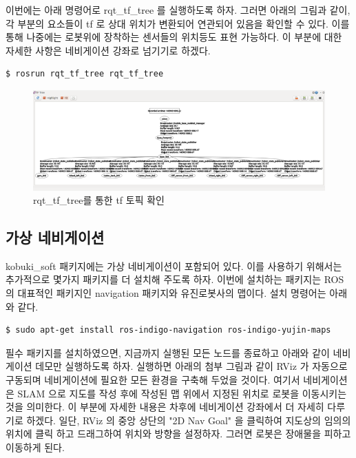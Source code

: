 이번에는 아래 명령어로 rqt\_tf\_tree 를 실행하도록 하자. 그러면 아래의 그림과 같이, 각 부분의 요소들이 tf 로 상대 위치가 변환되어 연관되어 있음을 확인할 수 있다. 이를 통해 나중에는 로봇위에 장착하는 센서들의 위치등도 표현 가능하다. 이 부분에 대한 자세한 사항은 네비게이션 강좌로 넘기기로 하겠다.

\vspace{\baselineskip}
\begin{lstlisting}[language=ROS]
$ rosrun rqt_tf_tree rqt_tf_tree 
\end{lstlisting}

\begin{figure}[h]
\centering\includegraphics[width=\columnwidth]{pictures/chapter10/rqt_tf_tree_kobuki_tf.png}
\caption{rqt\_tf\_tree를 통한 tf 토픽 확인}
\end{figure}

\newpage
\subsection{가상 네비게이션}

kobuki\_soft 패키지에는 가상 네비게이션이 포함되어 있다. 이를 사용하기 위해서는 추가적으로 몇가지 패키지를 더 설치해 주도록 하자. 이번에 설치하는 패키지는 ROS 의 대표적인 패키지인 navigation 패키지와 유진로봇사의 맵이다. 설치 명령어는 아래와 같다.

\vspace{\baselineskip}
\begin{lstlisting}[language=ROS]
$ sudo apt-get install ros-indigo-navigation ros-indigo-yujin-maps
\end{lstlisting}

필수 패키지를 설치하였으면, 지금까지 실행된 모든 노드를 종료하고 아래와 같이 네비게이션 데모만 실행하도록 하자. 실행하면 아래의 첨부 그림과 같이 RViz 가 자동으로 구동되며 네비게이션에 필요한 모든 환경을 구축해 두었을 것이다. 여기서 네비게이션은 SLAM 으로 지도를 작성 후에  작성된 맵 위에서 지정된 위치로 로봇을 이동시키는 것을 의미한다. 이 부분에 자세한 내용은 차후에 네비게이션 강좌에서 더 자세히 다루기로 하겠다. 일단, RViz 의 중앙 상단의 "2D Nav Goal" 을 클릭하여 지도상의 임의의 위치에 클릭 하고 드래그하여 위치와 방향을 설정하자. 그러면 로봇은 장애물을 피하고 이동하게 된다. 

